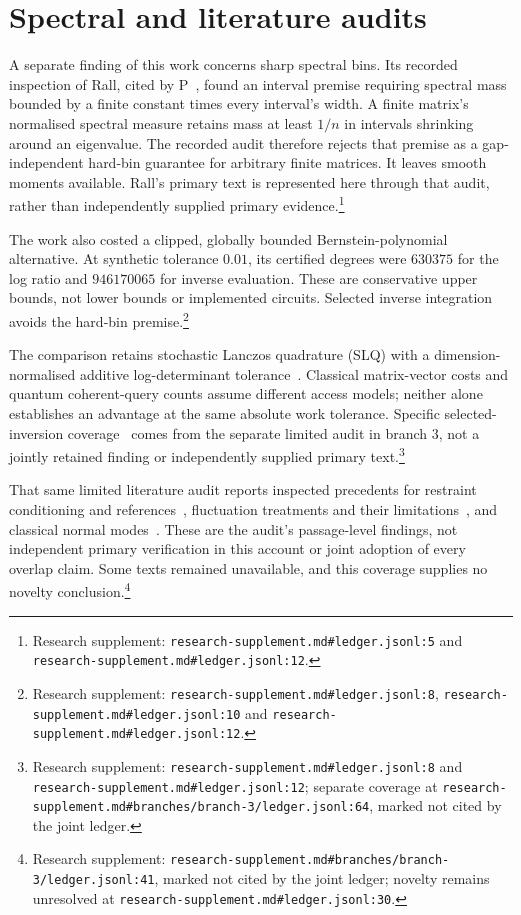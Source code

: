 \documentclass{article}
\begin{document}
\section{Spectral and literature audits}

A separate finding of this work concerns sharp spectral bins. Its recorded inspection of Rall, cited by P~\cite{Rall,P}, found an interval premise requiring spectral mass bounded by a finite constant times every interval's width. A finite matrix's normalised spectral measure retains mass at least \(1/n\) in intervals shrinking around an eigenvalue. The recorded audit therefore rejects that premise as a gap-independent hard-bin guarantee for arbitrary finite matrices. It leaves smooth moments available. Rall's primary text is represented here through that audit, rather than independently supplied primary evidence.\footnote{Research supplement: \nolinkurl{research-supplement.md#ledger.jsonl:5} and \nolinkurl{research-supplement.md#ledger.jsonl:12}.}

The work also costed a clipped, globally bounded Bernstein-polynomial alternative. At synthetic tolerance \(0.01\), its certified degrees were \(630375\) for the log ratio and \(946170065\) for inverse evaluation. These are conservative upper bounds, not lower bounds or implemented circuits. Selected inverse integration avoids the hard-bin premise.\footnote{Research supplement: \nolinkurl{research-supplement.md#ledger.jsonl:8}, \nolinkurl{research-supplement.md#ledger.jsonl:10} and \nolinkurl{research-supplement.md#ledger.jsonl:12}.}

The comparison retains stochastic Lanczos quadrature (SLQ) with a dimension-normalised additive log-determinant tolerance~\cite{SLQ}. Classical matrix-vector costs and quantum coherent-query counts assume different access models; neither alone establishes an advantage at the same absolute work tolerance. Specific selected-inversion coverage~\cite{SelInv} comes from the separate limited audit in branch 3, not a jointly retained finding or independently supplied primary text.\footnote{Research supplement: \nolinkurl{research-supplement.md#ledger.jsonl:8} and \nolinkurl{research-supplement.md#ledger.jsonl:12}; separate coverage at \nolinkurl{research-supplement.md#branches/branch-3/ledger.jsonl:64}, marked not cited by the joint ledger.}

That same limited literature audit reports inspected precedents for restraint conditioning and references~\cite{Woo,Gumbart,Ebrahimi}, fluctuation treatments and their limitations~\cite{Lee,Deng}, and classical normal modes~\cite{Lindahl}. These are the audit's passage-level findings, not independent primary verification in this account or joint adoption of every overlap claim. Some texts remained unavailable, and this coverage supplies no novelty conclusion.\footnote{Research supplement: \nolinkurl{research-supplement.md#branches/branch-3/ledger.jsonl:41}, marked not cited by the joint ledger; novelty remains unresolved at \nolinkurl{research-supplement.md#ledger.jsonl:30}.}



\end{document}

